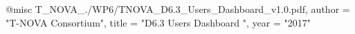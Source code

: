 @misc{ T_NOVA_./WP6/TNOVA_D6.3_Users_Dashboard_v1.0.pdf,
       author = "{T-NOVA Consortium}",
       title = "D6.3 Users Dashboard ",
       year = "2017" }
